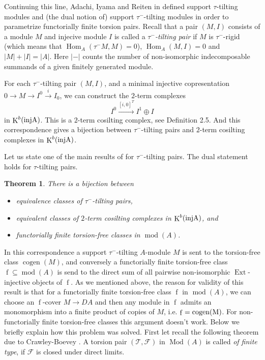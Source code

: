 \documentclass[12pt]{amsart}
\numberwithin{equation}{section}
\newtheorem{theorem}[lemma]{Theorem}
\theoremstyle{definition}
\DeclareMathOperator{\Mod}{Mod}
\DeclareMathOperator{\modd}{mod}
\DeclareMathOperator{\Hom}{Hom}
\DeclareMathOperator{\Ext}{Ext}
\DeclareMathOperator{\K}{K}
\DeclareMathOperator{\cogen}{cogen}
\DeclareMathOperator{\fs}{f}
\newtheorem*{theorem 0*}{Theorem}
\newtheorem*{theorem a*}{Theorem A}
\newtheorem*{theorem b*}{Theorem B}
\numberwithin{diagram}{section}
\begin{document}
Continuing this line, Adachi, Iyama and Reiten in \cite{AIR} defined support $\tau$-tilting modules and (the dual notion of) support $\tau^-$-tilting modules in order to parametrize functorially finite torsion pairs.
Recall that a pair $(M,I)$ consists of a module $M$ and injecive module $I$ is called a {\it $\tau^-$-tilting pair} if $M$ is $\tau^-$-rigid (which means that $\Hom_A(\tau^-M,M)=0$), $\Hom_A(M,I)=0$ and $|M|+|I|=|A|$. Here $|-|$ counts the number of non-isomorphic indecomposable summands of a given finitely generated module.

For each $\tau^-$-tilting pair $(M,I)$, and a minimal injective copresentation $0\rightarrow M\rightarrow I^0\overset{i}{\rightarrow}I_0$, we can construct the $2$-term complexes
\[I^0\overset{[i,0]^T}{\longrightarrow} I^1\oplus I\]
in $\K^b(\rm inj A)$. This is a $2$-term cosilting complex, see Definition 2.5. And this correspondence gives a bijection between $\tau^-$-tilting pairs and $2$-term cosilting complexes in $\K^b(\rm inj A)$.
	
Let us state one of the main results of \cite{AIR} for $\tau^-$-tilting pairs. The dual statement holds for $\tau$-tilting pairs.
\begin{theorem}\label{2.4}
There is a bijection between
	\begin{itemize}
	\item[(1)] equivalence classes of $\tau^-$-tilting pairs,
	\item[(2)] equivalent classes of $2$-term cosilting complexes in $\K^b(\rm inj A)$, and
	  \item[(3)] functorially finite torsion-free classes in $\modd(A)$.
	\end{itemize}
\end{theorem}
	
	In this correspondence a support $\tau^-$-tilting $A$-module $M$ is sent to the torsion-free class $\cogen(M)$, and conversely a functorially finite torsion-free class $\fs\subseteq \modd(A)$ is send to the direct sum of all pairwise non-isomorphic $\Ext$-injective objects of $\fs$. As we mentioned above, the reason for validity of this result is that for a functorially finite torsion-free class $\fs$ in $\modd(A)$, we can choose an $\fs$-cover $M\rightarrow DA$ and then any module in $\fs$ admits an monomorphism into a finite product of copies of $M$, i.e. $\fs=\rm cogen(M)$. For non-functorially finite torsion-free classes this argument doesn't work.
Below we briefly explain how this problem was solved.
First let recall the following theorem due to Crawley-Boevey \cite{CB}. A torsion pair $(\mathcal{T},\mathcal{F})$ in $\Mod(A)$ is called {\it of finite type}, if $\mathcal{F}$ is closed under direct limits.
	
\end{document}
